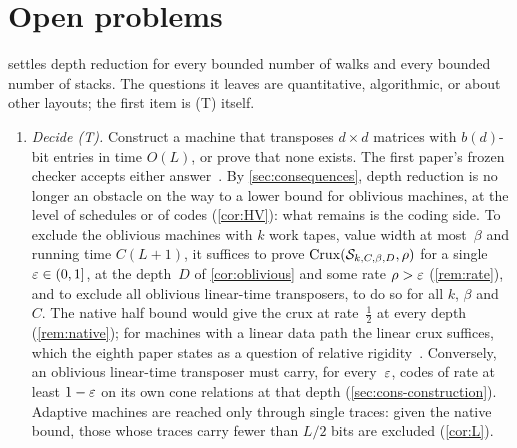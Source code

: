 \section{Open problems}\label{sec:open}

 settles depth reduction for every bounded number of walks and every bounded number of stacks. The questions it
leaves are quantitative, algorithmic, or about other layouts; the first item is (T) itself.

\begin{enumerate}[label=\arabic*.,leftmargin=2em]
\item \emph{Decide (T).} Construct a machine that transposes $d\times d$ matrices with $b(d)$-bit entries in time $O(L)$, or prove
that none exists. The first paper's frozen checker accepts either answer~\cite{FirstPaper2026}. By \cref{sec:consequences},
depth reduction is no longer an obstacle on the way to a lower bound for oblivious machines, at the level of schedules or of
codes (\cref{cor:HV}): what remains is the coding side.
To exclude the oblivious machines with $k$ work tapes, value width at most~$\beta$ and running time $C(L+1)$, it suffices to
prove $\mathrm{Crux}(\mathcal S_{k,C,\beta,D},\rho)$ for a single $\varepsilon\in(0,1]$, at the depth~$D$ of \cref{cor:oblivious} and some rate
$\rho>\varepsilon$ (\cref{rem:rate}), and to exclude all oblivious linear-time transposers, to do so for all $k$, $\beta$ and~$C$. The
native half bound would give the crux at rate~$\frac12$ at every depth (\cref{rem:native}); for machines with a linear data path
the linear crux suffices, which the eighth paper states as a question of relative rigidity~\cite[Problem~10.6]{EighthPaper2026}.
Conversely, an oblivious linear-time transposer must carry, for every~$\varepsilon$, codes of rate at least $1-\varepsilon$ on its own cone
relations at that depth (\cref{sec:cons-construction}). Adaptive machines are reached only through single traces: given the native bound,
those whose traces carry fewer than $L/2$ bits are excluded (\cref{cor:L}).


\end{enumerate}
